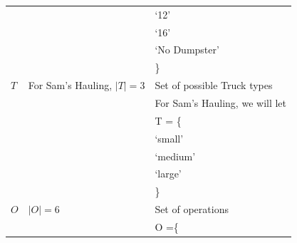\documentclass{article}
\begin{document}
\begin{tabular}{ l | l | l }
                               & $                                                           $  &   `12'                                                        \\
                               & $                                                           $  &   `16'                                                        \\
                               & $                                                           $  &   `No Dumpster'                                               \\
                               & $                                                           $  & \}                                                            \\
  $T$                          &   For Sam's Hauling, $ |T| = 3$                                & Set of possible Truck types                                   \\
                               & $                                                           $  & For Sam's Hauling, we will let                                \\
                               & $                                                           $  & T = \{                                                        \\
                               & $                                                           $  &  `small'                                                      \\
                               & $                                                           $  &  `medium'                                                     \\
                               & $                                                           $  &  `large'                                                      \\
                               & $                                                           $  & \}                                                            \\
  $O$                          & $  |O| = 6                                                  $  & Set of operations                                             \\
                               & $                                                           $  & O =\{                                                         \\

\end{tabular}
\end{document}
